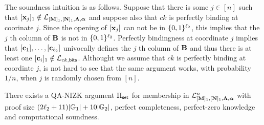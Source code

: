 The soundness intuition is as follows. Suppose that there is some $j\in[n]$ such that $[\mathbf{x}_j]_1\notin{\mathcal{L}_{[\mathbf{{M}}]_1,[\mathbf{{N}}]_1,\mathbf{{\Lambda}},{\boldsymbol \alpha}}}$ and suppose also that $ck$ is perfectly binding at coorinate $j$. Since the opening of $[\mathbf{x}_j]$ can not be in $\{0,1\}^{\ell_2}$, this implies that the $j$ th column of $\mathbf{{B}}$ is not in $\{0,1\}^{\ell_2}$. Perfectly bindingness at coordinate $j$ implies that $[\mathbf{c}_1],\ldots,[\mathbf{c}_{\ell_2}]$ univocally defines the $j$ th column of $\mathbf{{B}}$ and thus there is at least one $[\mathbf{c}_i]_1\notin\mathcal{L}_{ck,\mathsf{bits}}$. Althought we assume that $ck$ is perfectly binding at coordinte $j$, is not hard to see that the same argument works, with probability $1/n$, when $j$ is randomly chosen from $[n]$. 
 \begin{theorem} \label{theo:aggset} There exists a QA-NIZK argument $\Pi_{\mathsf{set}}$ for membership in $\mathcal{L}_{[\mathbf{{M}}]_1,[\mathbf{{N}}]_1,\mathbf{{\Lambda}},{\boldsymbol \alpha}}^n$ with proof size  $(2{\ell_2}+11)|\mathbb{G}_1|+10|\mathbb{G}_2|$, perfect completeness, perfect-zero knowledge and computational soundness. 
\end{theorem}
